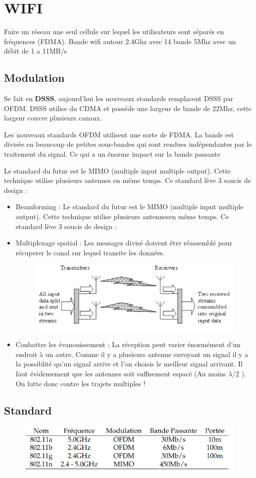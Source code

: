 \section{WIFI}
	Faire un réseau une seul cellule sur lequel les utilisateurs sont séparés en fréquences (FDMA). Bande wifi autour 2.4Ghz avec 14 bande 5Mhz avec un débit de 1 a 11MB/s
	\subsection{Modulation}
		Se fait en \textbf{DSSS}, aujourd’hui les nouveaux standards remplacent DSSS par OFDM. DSSS utilise du CDMA et possède une largeur de bande de 22Mhz, cette largeur couvre plusieurs canaux.
		
		Les nouveaux standards OFDM utilisent une sorte de FDMA. La bande est divisée en beaucoup de petites sous-bandes qui sont rendues indépendantes par le traitement du signal. Ce qui a un énorme impact sur la bande passante
		
		Le standard du futur est le MIMO (multiple input multiple output). Cette technique utilise plusieurs antennes en même temps. Ce standard lève 3 soucis de design :
		
		\begin{itemize}
			\item Beamforming : Le standard du futur est le MIMO (multiple input multiple output). Cette technique utilise plusieurs antennesen même temps. Ce standard lève 3 soucis de design :
			\item Multiplexage spatial : Les messages divisé doivent être réassemblé pour récuperer le canal sur lequel transite les données. 
			
				\begin{figure}[H]
					\centering
					\includegraphics[width=\textwidth]{img/wifi/M.png}
				\end{figure}
			\item Conbattre les évanouissement : La réception peut varier énormément d’un endroit à un autre. Comme il y a plusieurs antenne envoyant un signal il y a la possiblité qu’un signal arrive et l’on choisis le meilleur signal arrivant. Il faut évidemement que les antennes soit suffisement espacé (Au moins $\lambda$/2 ).
On lutte donc contre les trajets multiples !
		\end{itemize}
		
	\subsection{Standard}
		\begin{figure}[H]
			\centering
			\includegraphics[width=\textwidth]{img/wifi/S.png}
		\end{figure}
		